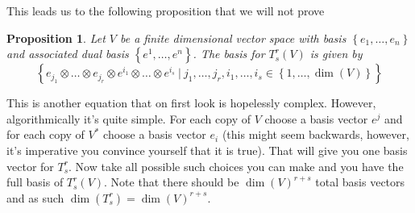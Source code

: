 \documentclass[a4paper]{article}
\newtheorem*{prop}{Proposition}
\begin{document}
This leads us to the following proposition that we will not prove
\begin{prop}
  Let $V$ be a finite dimensional vector space with basis $\left\{e_1, \dots, e_n \right\}$ and associated dual basis $ \left\{ e^1, \dots, e^n \right\}$. The basis for $T^r_s(V)$ is given by
  \[
    \left\{ e_{j_1} \otimes \dots \otimes e_{j_r} \otimes e^{i_1} \otimes \dots \otimes e^{i_s}\ |\ j_1, \dots, j_r, i_1, \dots, i_s \in \left\{ 1, \dots, \dim(V) \right\}\right\}
  \]
\end{prop}
This is another equation that on first look is hopelessly complex. However, algorithmically it's quite simple. For each copy of $V$ choose a basis vector $e^{j}$ and for each copy of $V^*$ choose a basis vector $e_i$ (this might seem backwards, however, it's imperative you convince yourself that it is true). That will give you one basis vector for $T_s^r$. Now take all possible such choices you can make and you have the full basis of $T_s^r(V)$. Note that there should be $\dim(V)^{r+s}$ total basis vectors and as such $\dim(T_s^r) = \dim(V)^{r+s}$.
\end{document}

